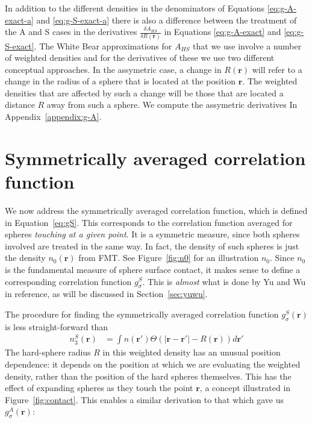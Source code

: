 \documentclass[letterpaper,twocolumn,amsmath,amssymb,jcp,10pt,aip]{revtex4-1}
\newcommand{\rr}{\textbf{r}}
\newcommand{\derivation}[1]{} %
\begin{document}
In addition to the different densities in the denominators of Equations 
\ref{eq:g-A-exact-a} and \ref{eq:g-S-exact-a} there is also a difference 
between the treatment of the A and S cases in the derivatives 
$\frac{\delta A_{HS}}{\delta R(\mathbf{r})}$ in Equations \ref{eq:g-A-exact} 
and \ref{eq:g-S-exact}. The White Bear approximations for $A_{HS}$ 
that we use involve a number of weighted densities and for the derivatives 
of these we use two different conceptual approaches.  In the assymetric case, 
a change in $R(\mathbf{r})$ will refer to a change in the radius of a sphere 
that is located at the position $\mathbf{r}$.  The weighted densities that are 
affected by such a change will be those that are located a distance $R$ away 
from such a sphere.  We compute the assymetric derivatives In Appendix~\ref{appendix:g-A}.     

\derivation{
  \end{widetext}
}

\section{Symmetrically averaged correlation function}\label{sec:g-S}

We now address the symmetrically averaged correlation function, which
is defined in Equation~\ref{eq:gS}.  This corresponds to the
correlation function averaged for
spheres \emph{touching at a given point}.  It is a symmetric
measure, since both spheres involved are treated in the same way.  In
fact, the density of such spheres is just the density $n_0(\rr)$ from
FMT.  See Figure~\ref{fig:n0} for an illustration $n_0$.  Since $n_0$
is the fundamental measure of sphere surface contact, it makes sense
to define a corresponding correlation function $g_\sigma^S$.  This is
\emph{almost} what is done by Yu and  Wu in
reference\cite{yu2002fmt-dft-inhomogeneous-associating}, as will be
discussed in Section~\ref{sec:yuwu}.

The procedure for finding the symmetrically averaged correlation
function $g_\sigma^S(\rr)$ is less straight-forward than 
\begin{align}
  n_3^S(\rr) &= \int n(\rr')\Theta(|\rr-\rr'|-R(\rr))d\rr'
\end{align}
The hard-sphere radius $R$ in this weighted density has an unusual
position dependence:  it depends on the position at which we are
evaluating the weighted density, rather than the position of the hard
spheres themselves.  This has the effect of expanding spheres as they
touch the point $\rr$, a concept illustrated in
Figure~\ref{fig:contact}.  This enables a similar derivation to that
which gave us $g_\sigma^A(\rr)$:
\end{document}
